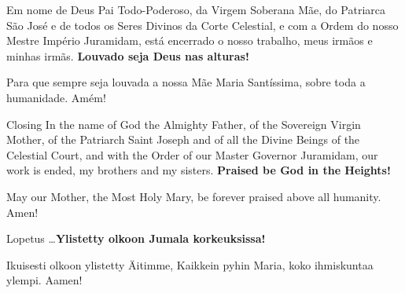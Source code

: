   \begin{passage}[PT]{}
    Em nome de Deus Pai Todo-Poderoso, da Virgem
    Soberana Mãe, do Patriarca São José e de todos
    os Seres Divinos da Corte Celestial, e com
    a Ordem do nosso Mestre Império Juramidam,
    está encerrado o nosso trabalho, meus irmãos
    e minhas irmãs.
    \textbf{Louvado seja Deus nas alturas!}
    \par
    Para que sempre seja louvada a nossa Mãe Maria
    Santíssima, sobre toda a humanidade. Amém!
  \end{passage}
  \begin{passage}[EN]{Closing}
    In the name of God the Almighty Father, of the Sovereign
    Virgin Mother, of the Patriarch Saint Joseph and of all
    the Divine Beings of the Celestial Court, and with
    the Order of our Master Governor Juramidam,
    our work is ended, my brothers and my sisters.
    \textbf{Praised be God in the Heights!}
    \par
    May our Mother, the Most Holy Mary, be forever
    praised above all humanity. Amen!
  \end{passage}
  \begin{passage}[FI]{Lopetus}
    \ldots\textbf{Ylistetty olkoon Jumala korkeuksissa!}
    \par
    Ikuisesti olkoon ylistetty Äitimme, Kaikkein pyhin Maria,
    koko ihmiskuntaa ylempi. Aamen!
  \end{passage}
\endsong


